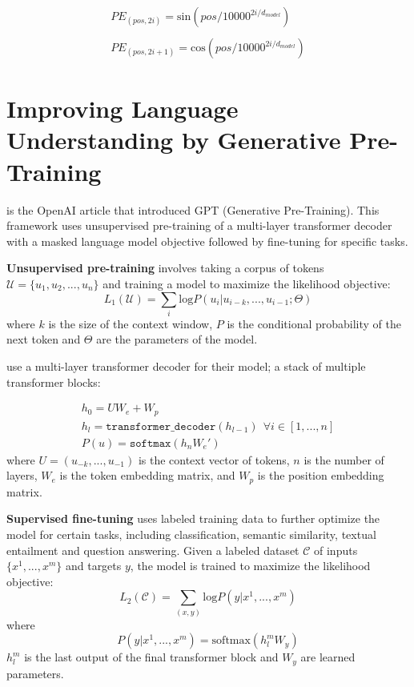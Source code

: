\documentclass[11pt]{article}
\theoremstyle{definition}
\begin{document}
\begin{equation}
\begin{array}{l}
PE_{(pos,2i)} = \mathrm{sin}(pos/10000^{2i/d_{model}}) \\ \\ 
PE_{(pos,2i+1)} = \mathrm{cos}(pos/10000^{2i/d_{model}})
\end{array}
\end{equation}

\section{Improving Language Understanding by Generative Pre-Training}

\cite{radford2018gpt} is the OpenAI article that introduced GPT (Generative Pre-Training). This framework uses unsupervised pre-training of a multi-layer transformer decoder with a masked language model objective followed by fine-tuning for specific tasks.

\textbf{Unsupervised pre-training} involves taking a corpus of tokens $\mathcal{U} = \{u_1, u_2, ..., u_n \}$ and training a model to maximize the likelihood objective:
\begin{equation}
L_1(\mathcal{U}) = \sum_i \mathrm{log} P (u_i|u_{i-k}, ...,u_{i-1}; \Theta)
\end{equation}
where $k$ is the size of the context window, $P$ is the conditional probability of the next token and $\Theta$ are the parameters of the model.

\cite{radford2018gpt} use a multi-layer transformer decoder for their model; a stack of multiple transformer blocks:

\begin{equation}
\begin{array}{l}
h_0 = UW_e + W_p \\
h_l = \mathtt{transformer\_decoder}(h_{l-1}) \ \ \forall i \in \left[1,...,n \right] \\
P(u) = \mathtt{softmax}(h_nW_e')
\end{array}
\end{equation}
where $U = (u_{-k},...,u_{-1})$ is the context vector of tokens, $n$ is the number of layers, $W_e$ is the token embedding matrix, and $W_p$ is the position embedding matrix.

\textbf{Supervised fine-tuning} uses labeled training data to further optimize the model for certain tasks, including classification, semantic similarity, textual entailment and question answering. Given a labeled dataset $\mathcal{C}$ of inputs $\{x^1, ...,x^m \}$ and targets $y$, the model is trained to maximize the likelihood objective:
\begin{equation}
L_2(\mathcal{C}) = \sum_{(x,y)} \mathrm{log} P (y|x^1,...,x^m)
\end{equation}
where
\begin{equation}
P (y|x^1,...,x^m) = \mathrm{softmax}(h_l^mW_y)
\end{equation}
$h_l^m$ is the last output of the final transformer block and $W_y$ are learned parameters. 
\end{document}
